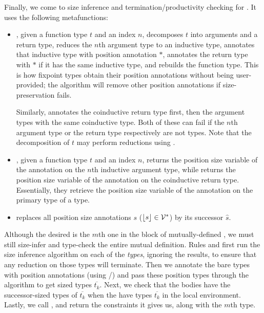 Finally, we come to size inference and termination/productivity checking for \cofixpoints.
It uses the following metafunctions:
\begin{itemize}
  \item \setrecstars, given a function type $t$ and an index $n$, decomposes $t$ into arguments and a return type, reduces the $n$th argument type to an inductive type, annotates that inductive type with position annotation $*$, annotates the return type with $*$ if it has the same inductive type, and rebuilds the function type.
    This is how fixpoint types obtain their position annotations without being user-provided; the algorithm will remove other position annotations if size-preservation fails.
    
    Similarly, \setcorecstars annotates the coinductive return type first, then the argument types with the same coinductive type.
    Both of these can fail if the $n$th argument type or the return type respectively are not \coinductive types.
    Note that the decomposition of $t$ may perform reductions using \whnf.
  \item \getrecvar, given a function type $t$ and an index $n$, returns the position size variable of the annotation on the $n$th inductive argument type, while \getcorecvar returns the position size variable of the annotation on the coinductive return type.
    Essentially, they retrieve the position size variable of the annotation on the primary \corecursive type of a \cofixpoint type.
  \item \shift replaces all position size annotations $s$ (\ie $\lfloor s\rfloor \in \mathcal{V}^*$) by its successor $\hat{s}$.
\end{itemize}

Although the desired \cofixpoint is the $m$th one in the block of mutually-defined \cofixpoints, we must still size-infer and type-check the entire mutual definition.
Rules  and  first run the size inference algorithm on each of the \cofixpoint \emph{types}, ignoring the results, to ensure that any reduction on those types will terminate.
Then we annotate the bare types with position annotations (using \setrecstars/\setcorecstars) and pass these position types through the algorithm to get sized types $\overline{t_k}$.
Next, we check that the \cofixpoint bodies have the successor-sized types of $\overline{t_k}$ when the \cofixpoints have types $\overline{t_k}$ in the local environment.
Lastly, we call \RecCheckLoop, and return the constraints it gives us, along with the $m$th \cofixpoint type.

